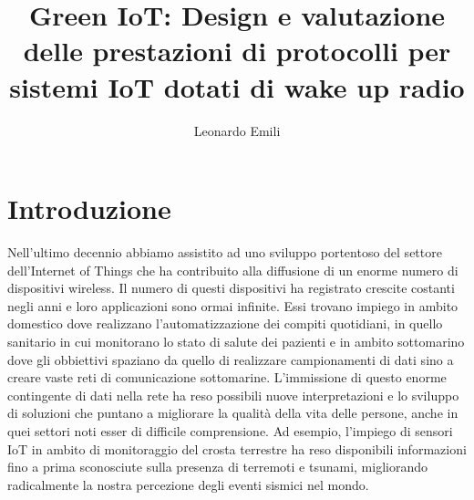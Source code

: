 \documentclass[binding=0.6cm,TFA]{sapthesis}
\title{Green IoT: Design e valutazione delle prestazioni di protocolli per sistemi IoT dotati di wake up radio}
\author{Leonardo Emili}
\begin{document}
\large

\frontmatter
\maketitle

\tableofcontents

\mainmatter
\chapter{Introduzione}


Nell'ultimo decennio abbiamo assistito ad uno sviluppo portentoso del settore dell'Internet of Things che ha contribuito alla diffusione
di un enorme numero di dispositivi wireless. Il numero di questi dispositivi ha registrato crescite costanti negli anni e loro applicazioni sono ormai infinite.
Essi trovano impiego in ambito domestico dove realizzano l'automatizzazione dei compiti quotidiani, in quello sanitario in cui monitorano lo stato di salute
dei pazienti e in ambito sottomarino dove gli obbiettivi spaziano da quello di realizzare campionamenti di dati sino a creare vaste reti di comunicazione sottomarine.
L'immissione di questo enorme contingente di dati nella rete ha reso possibili nuove interpretazioni e lo sviluppo di soluzioni che puntano a
migliorare la qualità della vita delle persone, anche in quei settori noti esser di difficile comprensione. Ad esempio, l'impiego di sensori IoT in ambito di
monitoraggio del crosta terrestre ha reso disponibili informazioni fino a prima sconosciute sulla presenza di terremoti e tsunami, migliorando radicalmente
la nostra percezione degli eventi sismici nel mondo.\\
\end{document}
